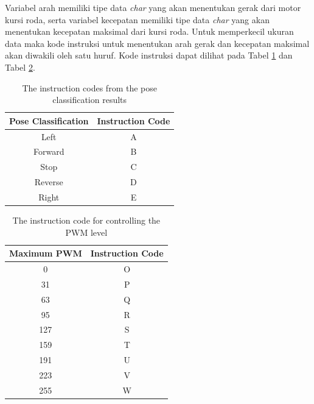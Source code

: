 Variabel arah memiliki tipe data \emph{char} yang akan menentukan gerak dari motor kursi roda, serta variabel kecepatan memiliki tipe data \emph{char} yang akan menentukan kecepatan maksimal dari kursi roda. Untuk memperkecil ukuran data maka kode instruksi untuk menentukan arah gerak dan kecepatan maksimal akan diwakili oleh satu huruf. Kode instruksi dapat dilihat pada Tabel \ref{tbl:kode-instruksi} dan Tabel \ref{tbl:kodePWM}. 

\begin{table}[h]
  \centering
      \caption{The instruction codes from the pose classification results}
      \label{tbl:kode-instruksi}
      \begin{tabular}{|c|c|}
          \hline
          Pose Classification & Instruction Code \\ \hline
          Left             & A              \\ \hline
          Forward             & B              \\ \hline
          Stop             & C              \\ \hline
          Reverse           & D              \\ \hline
          Right            & E              \\ \hline
      \end{tabular}
\end{table}


\begin{table}[!ht]
  \centering
  \caption{The instruction code for controlling the PWM level}
  \label{tbl:kodePWM}
  \begin{tabular}{|c|c|}
  \hline
  Maximum PWM & Instruction Code \\ \hline
  0           & O                \\ \hline
  31          & P                \\ \hline
  63          & Q                \\ \hline
  95          & R                \\ \hline
  127         & S                \\ \hline
  159         & T                \\ \hline
  191         & U                \\ \hline
  223         & V                \\ \hline
  255         & W                \\ \hline
  \end{tabular}
\end{table}

